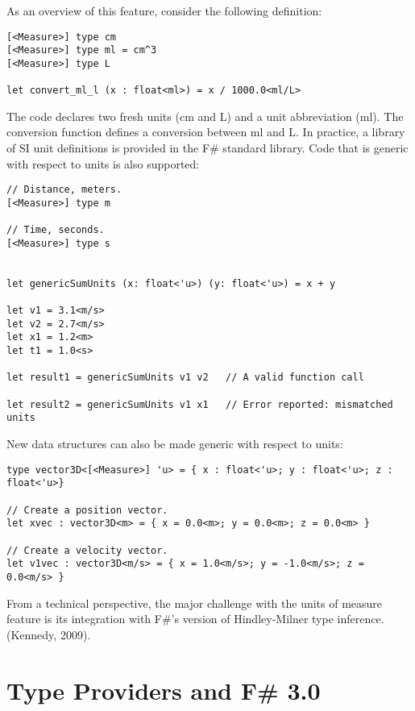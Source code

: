 \documentclass[acmsmall,review]{acmart}\settopmatter{printfolios=true,printccs=false,printacmref=false}
\begin{document}
As an overview of this feature, consider the following definition:

\begin{verbatim}
[<Measure>] type cm
[<Measure>] type ml = cm^3
[<Measure>] type L

let convert_ml_l (x : float<ml>) = x / 1000.0<ml/L>
\end{verbatim}

The code declares two fresh units (cm and L) and a unit abbreviation (ml).  The conversion function defines a conversion between ml and L.  In practice, a library of SI unit definitions is provided in the F\# standard library.  Code that is generic with respect to units is also supported:

\begin{verbatim}
// Distance, meters.
[<Measure>] type m

// Time, seconds.
[<Measure>] type s


let genericSumUnits (x: float<'u>) (y: float<'u>) = x + y

let v1 = 3.1<m/s>
let v2 = 2.7<m/s>
let x1 = 1.2<m>
let t1 = 1.0<s>

let result1 = genericSumUnits v1 v2   // A valid function call

let result2 = genericSumUnits v1 x1   // Error reported: mismatched units
\end{verbatim}

New data structures can also be made generic with respect to units:

\begin{verbatim}
type vector3D<[<Measure>] 'u> = { x : float<'u>; y : float<'u>; z : float<'u>}

// Create a position vector.
let xvec : vector3D<m> = { x = 0.0<m>; y = 0.0<m>; z = 0.0<m> }

// Create a velocity vector.
let v1vec : vector3D<m/s> = { x = 1.0<m/s>; y = -1.0<m/s>; z = 0.0<m/s> }
\end{verbatim}

From a technical perspective, the major challenge with the units of measure feature is its integration with F\#’s version of Hindley-Milner type inference. (Kennedy, 2009).


\section*{Type Providers and F\# 3.0 }
\end{document}

